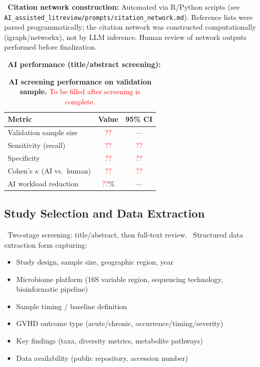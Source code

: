 \documentclass[11pt,a4paper]{article}
\newcommand{\todoitem}[1]{\textcolor{blue!70!black}{\textbullet~#1}}
\begin{document}
\todoitem{\textbf{Citation network construction:} Automated via R/Python scripts (see \texttt{AI\_assisted\_litreview/prompts/citation\_network.md}). Reference lists were parsed programmatically; the citation network was constructed computationally (igraph/networkx), not by LLM inference. Human review of network outputs performed before finalization.}

\todoitem{\textbf{AI performance (title/abstract screening):}}

\begin{table}[htbp]
\centering
\caption{\textbf{AI screening performance on validation sample.} \textcolor{red}{To be filled after screening is complete.}}
\label{tab:ai_performance}
\small
\begin{tabular}{@{}lcc@{}}
\toprule
Metric & Value & 95\% CI \\
\midrule
Validation sample size & \textcolor{red}{??} & --- \\
Sensitivity (recall) & \textcolor{red}{??} & \textcolor{red}{??} \\
Specificity & \textcolor{red}{??} & \textcolor{red}{??} \\
Cohen's $\kappa$ (AI vs.\ human) & \textcolor{red}{??} & \textcolor{red}{??} \\
AI workload reduction & \textcolor{red}{??}\% & --- \\
\bottomrule
\end{tabular}
\end{table}

\subsection{Study Selection and Data Extraction}
\label{sec:extraction}
\todoitem{Two-stage screening: title/abstract, then full-text review.}
\todoitem{Structured data extraction form capturing:}
\begin{itemize}[nosep]
    \item Study design, sample size, geographic region, year
    \item Microbiome platform (16S variable region, sequencing technology, bioinformatic pipeline)
    \item Sample timing / baseline definition
    \item GVHD outcome type (acute/chronic, occurrence/timing/severity)
    \item Key findings (taxa, diversity metrics, metabolite pathways)
    \item Data availability (public repository, accession number)
\end{itemize}
\end{document}
